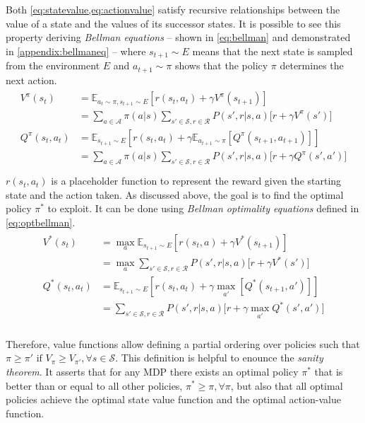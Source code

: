 Both \vref{eq:statevalue,eq:actionvalue} satisfy recursive relationships between the value of a state and the values of its successor states.
It is possible to see this property deriving \textit{Bellman equations} \cite{bellman2015applied} -- shown in \vref{eq:bellman} and demonstrated in \vref{appendix:bellmaneq} -- where $s_{t+1}\sim \mathit{E}$ means that the next state is sampled from the environment $E$ and $a_{t+1}\sim \pi$ shows that the policy $\pi$ determines the next action.
\begin{align} \label{eq:bellman}
	\begin{split}
		V^\pi(s_t) &= \mathbb{E}_{a_t \sim \pi, s_{t+1} \sim E}[r(s_t, a_t) + \gamma V^\pi(s_{t+1})] \\
		&= \sum_{a \in \mathcal{A}}\pi(a|s)\sum_{s' \in \mathcal{S}, r \in \mathcal{R}}P(s', r | s, a)\big[r + \gamma V^\pi(s')\big]\\
		Q^\pi(s_t,a_t) &= \mathbb{E}_{s_{t+1} \sim E}[r(s_t, a_t) + \gamma \mathbb{E}_{ a_{t+1} \sim \pi}[Q^\pi(s_{t+1}, a_{t+1})]]\\
		&= \sum_{a \in \mathcal{A}}\pi(a|s)\sum_{s' \in \mathcal{S}, r \in \mathcal{R}}P(s', r | s, a)\big[r + \gamma Q^\pi(s',a')\big]\\
	\end{split}
\end{align}
$r(s_t, a_t)$ is a placeholder function to represent the reward given the starting state and the action taken.
As discussed above, the goal is to find the optimal policy $\pi^*$ to exploit.
It can be done using \textit{Bellman optimality equations} defined in \vref{eq:optbellman}.
\begin{align} \label{eq:optbellman}
	\begin{split}
		V^*(s_t) &= \max_{a} \mathbb{E}_{s_{t+1} \sim E}[r(s_t, a) + \gamma V^*(s_{t+1})] \\
		&= \max_{a}\sum_{s' \in \mathcal{S}, r \in \mathcal{R}}P(s', r | s, a)\big[r + \gamma V^*(s')\big]\\
		Q^*(s_t,a_t) &= \mathbb{E}_{s_{t+1} \sim E}[r(s_t, a_t) + \gamma \max_{a'}[Q^*(s_{t+1}, a')]]\\
		&= \sum_{s' \in \mathcal{S}, r \in \mathcal{R}}P(s', r | s, a)\big[r + \gamma \max_{a'} Q^*(s',a')\big]\\
	\end{split}
\end{align}

Therefore, value functions allow defining a partial ordering over policies such that $\pi \ge \pi' \text{ if } V_\pi \ge V_{\pi'},\forall s \in \mathcal{S}$.
This definition is helpful to enounce the \textit{sanity theorem}.
It asserts that for any MDP there exists an optimal policy $\pi^*$ that is better than or equal to all other policies, $\pi^* \ge \pi, \forall \pi$, but also that all optimal policies achieve the optimal state value function and the optimal action-value function.

